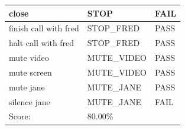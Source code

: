 \documentclass[11pt]{article}
\begin{document}
\begin{table}[H]
\begin{tabular}{lll}
\multicolumn{1}{l|}{close}                          & \multicolumn{1}{l|}{STOP}               & \cellcolor[HTML]{FD6864}FAIL \\ \hline
\multicolumn{1}{l|}{finish call with fred}          & \multicolumn{1}{l|}{STOP\_FRED}         & \cellcolor[HTML]{67FD9A}PASS \\ \hline
\multicolumn{1}{l|}{halt call with fred}            & \multicolumn{1}{l|}{STOP\_FRED}         & \cellcolor[HTML]{67FD9A}PASS \\ \hline
\multicolumn{1}{l|}{mute video}                     & \multicolumn{1}{l|}{MUTE\_VIDEO}        & \cellcolor[HTML]{67FD9A}PASS \\ \hline
\multicolumn{1}{l|}{mute screen}                    & \multicolumn{1}{l|}{MUTE\_VIDEO}        & \cellcolor[HTML]{67FD9A}PASS \\ \hline
\multicolumn{1}{l|}{mute jane}                      & \multicolumn{1}{l|}{MUTE\_JANE}         & \cellcolor[HTML]{67FD9A}PASS \\ \hline
\multicolumn{1}{l|}{silence jane}                   & \multicolumn{1}{l|}{MUTE\_JANE}         & \cellcolor[HTML]{FD6864}FAIL \\ \hline
\multicolumn{1}{l|}{Score:}                         & \multicolumn{1}{l|}{80.00\%}            &                              \\
\end{tabular}
\end{table}
\end{document}
